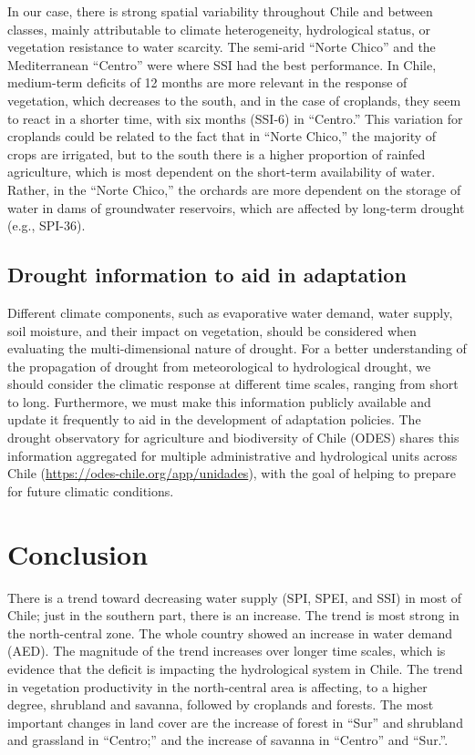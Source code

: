 \documentclass[
  authoryear,
  preprint,
  3p,
  onecolumn]{elsarticle}
\begin{document}
In our case, there is strong spatial variability throughout Chile and
between classes, mainly attributable to climate heterogeneity,
hydrological status, or vegetation resistance to water scarcity. The
semi-arid ``Norte Chico'' and the Mediterranean ``Centro'' were where
SSI had the best performance. In Chile, medium-term deficits of 12
months are more relevant in the response of vegetation, which decreases
to the south, and in the case of croplands, they seem to react in a
shorter time, with six months (SSI-6) in ``Centro.'' This variation for
croplands could be related to the fact that in ``Norte Chico,'' the
majority of crops are irrigated, but to the south there is a higher
proportion of rainfed agriculture, which is most dependent on the
short-term availability of water. Rather, in the ``Norte Chico,'' the
orchards are more dependent on the storage of water in dams of
groundwater reservoirs, which are affected by long-term drought (e.g.,
SPI-36).

\hypertarget{drought-information-to-aid-in-adaptation}{%
\subsection{Drought information to aid in
adaptation}\label{drought-information-to-aid-in-adaptation}}

Different climate components, such as evaporative water demand, water
supply, soil moisture, and their impact on vegetation, should be
considered when evaluating the multi-dimensional nature of drought. For
a better understanding of the propagation of drought \citep{VanLoon2012}
from meteorological to hydrological drought, we should consider the
climatic response at different time scales, ranging from short to long.
Furthermore, we must make this information publicly available and update
it frequently to aid in the development of adaptation policies. The
drought observatory for agriculture and biodiversity of Chile (ODES)
shares this information aggregated for multiple administrative and
hydrological units across Chile
(\url{https://odes-chile.org/app/unidades}), with the goal of helping to
prepare for future climatic conditions.

\hypertarget{conclusion}{%
\section{Conclusion}\label{conclusion}}

There is a trend toward decreasing water supply (SPI, SPEI, and SSI) in
most of Chile; just in the southern part, there is an increase. The
trend is most strong in the north-central zone. The whole country showed
an increase in water demand (AED). The magnitude of the trend increases
over longer time scales, which is evidence that the deficit is impacting
the hydrological system in Chile. The trend in vegetation productivity
in the north-central area is affecting, to a higher degree, shrubland
and savanna, followed by croplands and forests. The most important
changes in land cover are the increase of forest in ``Sur'' and
shrubland and grassland in ``Centro;'' and the increase of savanna in
``Centro'' and ``Sur.''.
\end{document}
